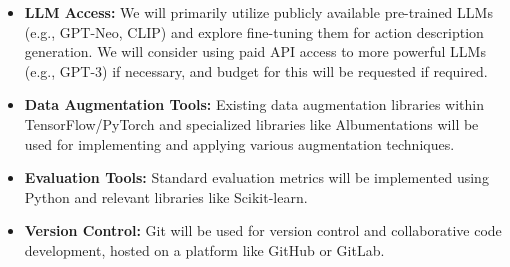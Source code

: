 \begin{itemize}[wide, labelindent=20pt]
    \item \textbf{LLM Access:} We will primarily utilize publicly available pre-trained LLMs (e.g., GPT-Neo, CLIP) and explore fine-tuning them for action description generation. We will consider using paid API access to more powerful LLMs (e.g., GPT-3) if necessary, and budget for this will be requested if required.
    \item \textbf{Data Augmentation Tools:} Existing data augmentation libraries within TensorFlow/PyTorch and specialized libraries like Albumentations will be used for implementing and applying various augmentation techniques.
    \item \textbf{Evaluation Tools:} Standard evaluation metrics will be implemented using Python and relevant libraries like Scikit-learn.
    \item \textbf{Version Control:} Git will be used for version control and collaborative code development, hosted on a platform like GitHub or GitLab.

\end{itemize}


